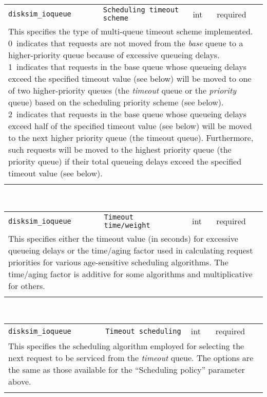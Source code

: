 \noindent 
\begin{tabular}{|p{1.5in}|p{3.5in}|p{0.5in}|p{0.5in}|}
\cline{1-4}
\texttt{disksim\_ioqueue} & \texttt{Scheduling timeout scheme} & int & required \\ 
\cline{1-4}
\multicolumn{4}{|p{6in}|}{
This specifies the type of multi-queue timeout scheme implemented.
0~indicates that requests are not moved from the {\it base} queue to a
higher-priority queue because of excessive queueing delays.
1~indicates that requests in the base queue whose queueing delays exceed
the specified timeout value (see below) will be moved to one of two
higher-priority queues (the {\it timeout} queue or the {\it priority}
queue) based on the scheduling priority scheme (see below).
2~indicates that requests in the base queue whose queueing
delays exceed half of the specified timeout value (see below) will be moved to
the next higher priority queue (the timeout queue). Furthermore, such
requests will be moved to the highest priority queue (the priority queue)
if their total queueing delays exceed the specified timeout value (see below).
}\\ 
\cline{1-4}
\multicolumn{4}{p{5in}}{}\\
\end{tabular}\\ 
\noindent 
\begin{tabular}{|p{1.5in}|p{3.5in}|p{0.5in}|p{0.5in}|}
\cline{1-4}
\texttt{disksim\_ioqueue} & \texttt{Timeout time/weight} & int & required \\ 
\cline{1-4}
\multicolumn{4}{|p{6in}|}{
This specifies either the timeout value (in seconds) for excessive
queueing delays or the time/aging factor used in calculating request
priorities for various age-sensitive scheduling algorithms. The
time/aging factor is additive for some algorithms and multiplicative
for others.
}\\ 
\cline{1-4}
\multicolumn{4}{p{5in}}{}\\
\end{tabular}\\ 
\noindent 
\begin{tabular}{|p{1.5in}|p{3.5in}|p{0.5in}|p{0.5in}|}
\cline{1-4}
\texttt{disksim\_ioqueue} & \texttt{Timeout scheduling} & int & required \\ 
\cline{1-4}
\multicolumn{4}{|p{6in}|}{
This specifies the scheduling algorithm employed for selecting the next
request to be serviced from the {\it timeout} queue. The options are
the same as those available for the ``Scheduling policy'' parameter
above.
}\\ 
\cline{1-4}
\multicolumn{4}{p{5in}}{}\\
\end{tabular}\\ 
